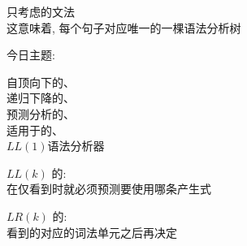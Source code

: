 
\begin{frame}{}
  \begin{center}
    只考虑的文法 \\[4pt]
    这意味着, 每个句子对应唯一的一棵语法分析树


    今日主题: 
  \end{center}
\end{frame}

\begin{frame}{}
  \begin{center}
    自顶向下的、\\[15pt]
    递归下降的、\\[15pt]
    预测分析的、\\[15pt]
    适用于的、\\[15pt]
    $LL(1)$语法分析器
  \end{center}
\end{frame}

\begin{frame}{}
  \begin{center}
    $LL(k)$ 的: \\[10pt]
    在仅看到时就必须预测要使用哪条产生式

    \pause
    \vspace{1.50cm}
    $LR(k)$ 的: \\[10pt]
    看到的对应的词法单元之后再决定
  \end{center}
\end{frame}
